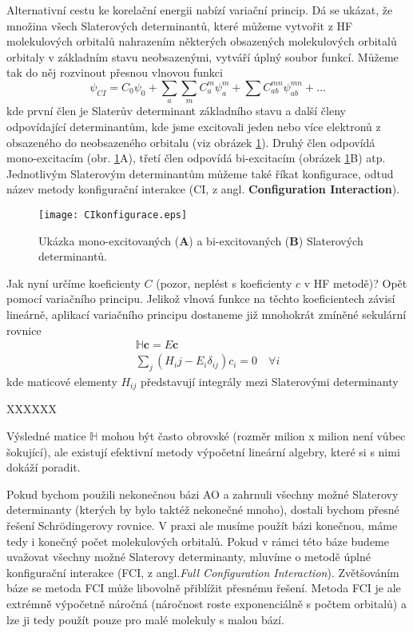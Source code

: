 Alternativní cestu ke korelační energii nabízí variační princip. Dá se ukázat, že množina všech Slaterových determinantů, které můžeme vytvořit z HF molekulových orbitalů nahrazením některých obsazených molekulových orbitalů orbitaly v základním stavu neobsazenými, vytváří úplný soubor funkcí. Můžeme tak do něj rozvinout přesnou vlnovou funkci 
\begin{equation}
\psi_{CI}=C_0\psi_0+\sum_a\sum_m C_a^m\psi_a^m+\sum C_{ab}^{mn}\psi_{ab}^{mn}+\dots
\label{rov:CIrozvoj}
\end{equation}
kde první člen je Slaterův determinant základního stavu a další členy odpovídající determinantům, kde jsme excitovali jeden nebo více elektronů z obsazeného do neobsazeného orbitalu (viz obrázek \ref{obr:abinitio:ci}). Druhý člen odpovídá mono-excitacím (obr. \ref{obr:abinitio:ci}A), třetí člen odpovídá bi-excitacím (obrázek \ref{obr:abinitio:ci}B) atp. Jednotlivým Slaterovým determinantům můžeme také říkat konfigurace, odtud název metody konfigurační interakce (CI, z angl. \textbf{Configuration Interaction}).

\begin{figure}
\centering
\texttt{[image: CIkonfigurace.eps]}
\caption[Excitované Slaterovy determinanty]{Ukázka mono-excitovaných (\textbf{A}) a bi-excitovaných (\textbf{B}) Slaterových determinantů.}
\label{obr:abinitio:ci}
\end{figure}

Jak nyní určíme koeficienty $C$ (pozor, neplést s koeficienty $c$ v HF metodě)? Opět pomocí variačního principu. Jelikož vlnová funkce na těchto koeficientech závisí lineárně, aplikací variačního principu dostaneme již mnohokrát zmíněné sekulární rovnice
\begin{eqnarray}
\mathbb{H}\mathbf{c}=E\mathbf{c} \nonumber \\
\sum_j (H_ij-E_i\delta_{ij})c_i=0 \quad \forall i
\end{eqnarray}
kde maticové elementy $H_{ij}$ představují integrály mezi Slaterovými determinanty

 
XXXXXX

Výsledné matice $\mathbb{H}$ mohou být často obrovské (rozměr milion x milion není vůbec šokující), ale existují efektivní metody výpočetní lineární algebry, které si s nimi dokáží poradit.

Pokud bychom použili nekonečnou bázi AO a zahrnuli všechny možné Slaterovy determinanty (kterých by bylo taktéž nekonečné mnoho), dostali bychom přesné řešení Schr\"{o}dingerovy rovnice. V praxi ale musíme použít bázi konečnou, máme tedy i konečný počet molekulových orbitalů. Pokud v rámci této báze budeme uvažovat všechny možné Slaterovy determinanty, mluvíme o metodě úplné konfigurační interakce (FCI, z angl.\textit{Full Configuration Interaction}). Zvětšováním báze se metoda FCI může libovolně přiblížit přesnému řešení. Metoda FCI je ale extrémně výpočetně náročná (náročnost roste exponenciálně s počtem orbitalů) a lze ji tedy použít pouze pro malé molekuly s malou bází.

